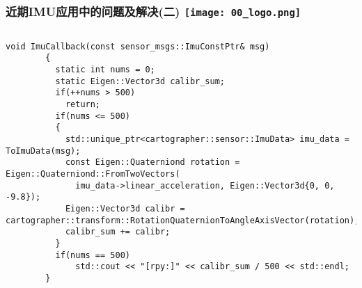 \begin{frame}[fragile]
  \frametitle{近期IMU应用中的问题及解决(二) \hfill \texttt{[image: 00\_logo.png]}}
  \begin{columns}
    
      \begin{lstlisting}[frame=shadowbox]  
        void ImuCallback(const sensor_msgs::ImuConstPtr& msg)
        {
          static int nums = 0;
          static Eigen::Vector3d calibr_sum;
          if(++nums > 500)
            return;
          if(nums <= 500)
          {
            std::unique_ptr<cartographer::sensor::ImuData> imu_data = ToImuData(msg);
            const Eigen::Quaterniond rotation = Eigen::Quaterniond::FromTwoVectors(
              imu_data->linear_acceleration, Eigen::Vector3d{0, 0, -9.8});  
            Eigen::Vector3d calibr = cartographer::transform::RotationQuaternionToAngleAxisVector(rotation);
            calibr_sum += calibr;
          }
          if(nums == 500)
              std::cout << "[rpy:]" << calibr_sum / 500 << std::endl;
        }
      \end{lstlisting}

    

  
  \end{columns}
  \end{frame}   

